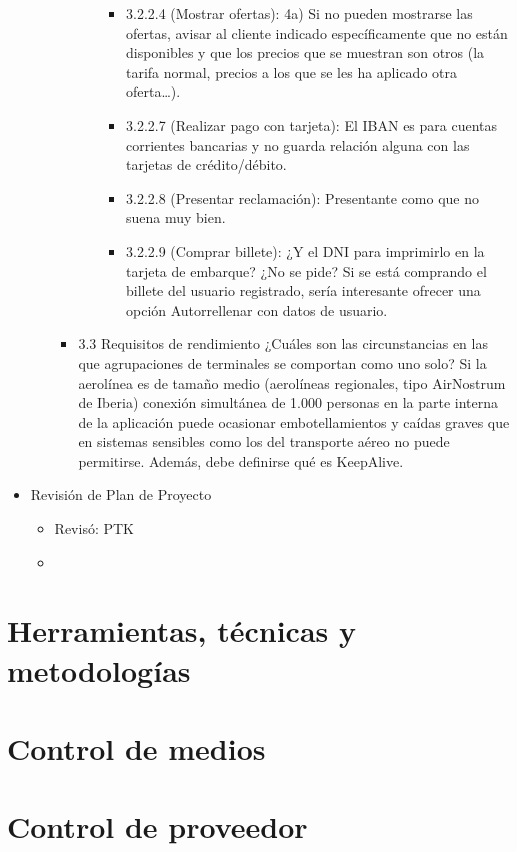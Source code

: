 \documentclass[11pt, a4paper, twoside, titlepage]{article}
\begin{document}
\begin{itemize}
\begin{itemize}
\begin{itemize}
\begin{itemize}
\begin{itemize}
									\item 3.2.2.4 (Mostrar ofertas): 4a) Si no pueden mostrarse las ofertas, avisar al cliente indicado específicamente que no están disponibles y que los precios que se muestran son otros (la tarifa normal, precios a los que se les ha aplicado otra oferta…). 
									\item 3.2.2.7 (Realizar pago con tarjeta): El IBAN es para cuentas corrientes bancarias y no guarda relación alguna con las tarjetas de crédito/débito. 
									\item 3.2.2.8 (Presentar reclamación): Presentante como que no suena muy bien. 
									\item 3.2.2.9 (Comprar billete): ¿Y el DNI para imprimirlo en la tarjeta de embarque? ¿No se pide? Si se está comprando el billete del usuario registrado, sería interesante ofrecer una opción Autorrellenar con datos de usuario.
									\end{itemize}
								\end{itemize}
							\item  3.3 Requisitos de rendimiento 
								¿Cuáles son las circunstancias en las que agrupaciones de terminales se comportan como uno solo? Si la aerolínea es de tamaño medio (aerolíneas regionales, tipo AirNostrum de Iberia) conexión simultánea de 1.000 personas en la parte interna de la aplicación puede ocasionar embotellamientos y caídas graves que en sistemas sensibles como los del transporte aéreo no puede permitirse. Además, debe definirse qué es KeepAlive.
						\end{itemize}
				\end{itemize}
			\item Revisión de Plan de Proyecto 
				\begin{itemize}
					\item Revisó: PTK
					\item %
				\end{itemize}
		\end{itemize}	
	\section{Herramientas, técnicas y metodologías}%
	\section{Control de medios}%
	\section{Control de proveedor}%
\end{document}
